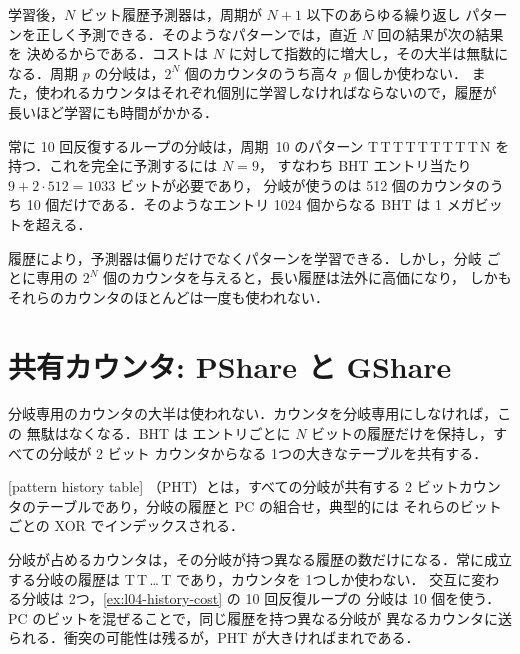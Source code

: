 \documentclass[../main.tex]{subfiles}
\begin{document}
学習後，$N$ ビット履歴予測器は，周期が $N+1$ 以下のあらゆる繰り返し
パターンを正しく予測できる．そのようなパターンでは，直近 $N$ 回の結果が次の結果を
決めるからである．コストは $N$ に対して指数的に増大し，その大半は無駄に
なる．周期 $p$ の分岐は，$2^N$ 個のカウンタのうち高々 $p$ 個しか使わない．
また，使われるカウンタはそれぞれ個別に学習しなければならないので，履歴が
長いほど学習にも時間がかかる．

\begin{example}
  \label{ex:l04-history-cost}
  常に 10 回反復するループの分岐は，周期~10 のパターン
  T\,T\,T\,T\,T\,T\,T\,T\,T\,N を持つ．これを完全に予測するには $N = 9$，
  すなわち BHT エントリ当たり $9 + 2\cdot 512 = 1033$ ビットが必要であり，
  分岐が使うのは 512 個のカウンタのうち 10 個だけである．そのようなエントリ
  1024 個からなる BHT は 1 メガビットを超える．
\end{example}

\begin{keypoint}
  履歴により，予測器は偏りだけでなくパターンを学習できる．しかし，分岐
  ごとに専用の $2^N$ 個のカウンタを与えると，長い履歴は法外に高価になり，
  しかもそれらのカウンタのほとんどは一度も使われない．
\end{keypoint}

\section{共有カウンタ: PShare と GShare}
\label{sec:l04-share}

分岐専用のカウンタの大半は使われない．カウンタを分岐専用にしなければ，この
無駄はなくなる．BHT は
エントリごとに $N$ ビットの履歴だけを保持し，すべての分岐が 2 ビット
カウンタからなる 1つの大きなテーブルを共有する．

\begin{definition}[パターン履歴テーブル]
  [pattern history table]%
  （PHT）とは，すべての分岐が共有する
  2 ビットカウンタのテーブルであり，分岐の履歴と PC の組合せ，典型的には
  それらのビットごとの XOR でインデックスされる．
\end{definition}

分岐が占めるカウンタは，その分岐が持つ異なる履歴の数だけになる．常に成立
する分岐の履歴は T\,T\,\ldots\,T であり，カウンタを 1つしか使わない．
交互に変わる分岐は 2つ，\cref{ex:l04-history-cost} の 10 回反復ループの
分岐は 10 個を使う．PC のビットを混ぜることで，同じ履歴を持つ異なる分岐が
異なるカウンタに送られる．衝突の可能性は残るが，PHT が大きければまれである．
\end{document}
